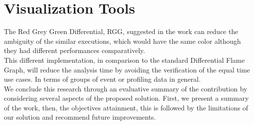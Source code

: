 \section{Visualization Tools}
The Red Grey Green Differential, RGG, suggested in the work can reduce the ambiguity of the similar executions, which would have the same color although they had different performances comparatively. \\
This different implementation, in comparison to the standard Differential Flame Graph, will reduce the analysis time by avoiding the verification of the equal time use cases. In terms of groups of event or profiling data in general.\\
We conclude this research through an evaluative summary of the contribution by considering several aspects of the proposed solution. First, we present a summary of the work, then, the objectives attainment, this is followed by the limitations of our solution and recommend future improvements.

